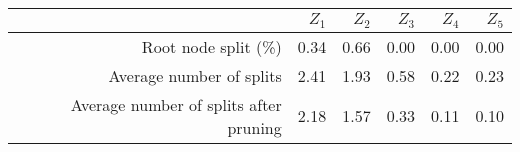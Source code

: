 \begin{tabular}{rrrrrr}
  \hline
 & $Z_{1}$ & $Z_{2}$ & $Z_{3}$ & $Z_{4}$ & $Z_{5}$ \\ 
  \hline
Root node split (\%) & 0.34 & 0.66 & 0.00 & 0.00 & 0.00 \\ 
  Average number of splits & 2.41 & 1.93 & 0.58 & 0.22 & 0.23 \\ 
  Average number of splits after pruning & 2.18 & 1.57 & 0.33 & 0.11 & 0.10 \\ 
   \hline
\end{tabular}


